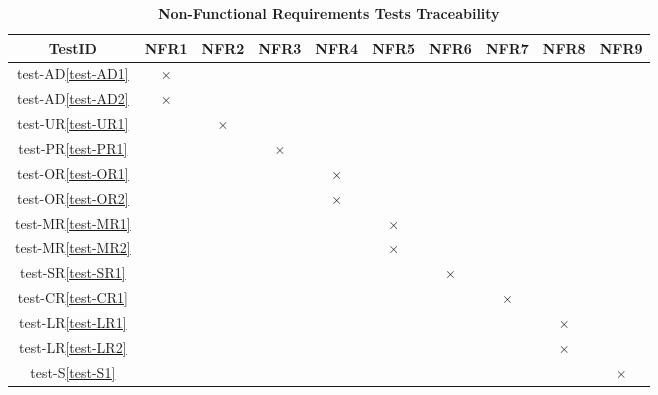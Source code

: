 \documentclass[12pt, titlepage]{article}
\begin{document}
\begin{table} [H]
  \centering
  \begin{tabular}{|c|c|c|c|c|c|c|c|c|c|}
    \hline
    TestID & NFR1 & NFR2 & NFR3 & NFR4 & NFR5 & NFR6 & NFR7 & NFR8 & NFR9 \\
    \hline
    test-AD\ref{test-AD1} & $\times$ & & & & & & & & \\
    \hline
    test-AD\ref{test-AD2} &  $\times$ & & & & & & & & \\
    \hline
    test-UR\ref{test-UR1} & & $\times$ & & & & & & &  \\
    \hline
    test-PR\ref{test-PR1} & & & $\times$ & & & & & & \\
    \hline
    test-OR\ref{test-OR1} & & & & $\times$ & & & & &  \\
    \hline
    test-OR\ref{test-OR2} & & & & $\times$ & & & & & \\
    \hline
    test-MR\ref{test-MR1} & & & & & $\times$ & & & &\\
    \hline
    test-MR\ref{test-MR2} & & & & & $\times$ & & & &  \\
    \hline
    test-SR\ref{test-SR1} & & & & & & $\times$ & & & \\
    \hline
    test-CR\ref{test-CR1} & & & & & & & $\times$ & &\\
    \hline
    test-LR\ref{test-LR1} & & & & & & & & $\times$ &\\
    \hline
    test-LR\ref{test-LR2} & & & & & & & & $\times$ & \\
    \hline
    test-S\ref{test-S1} & & & & & & & & & $\times$ \\
    \hline
  \end{tabular}
\caption{\bf Non-Functional Requirements Tests Traceability} \label{tab:nfr-test-traceability}
\end{table}
\end{document}
